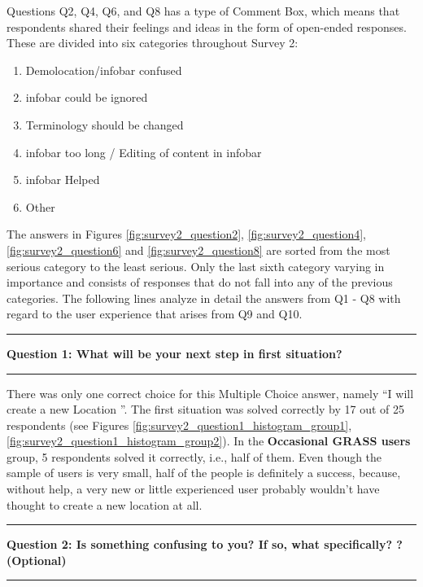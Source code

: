 \documentclass[a4paper,10pt,twoside]{article}
\begin{document}
\newpage
\noindent Questions Q2, Q4, Q6, and Q8 has a type of Comment Box,
which means that respondents shared their feelings and ideas in the
form of open-ended responses. These are divided into six categories
throughout Survey 2:

\begin{enumerate}
\item Demolocation/infobar confused
\item infobar could be ignored
\item Terminology should be changed
\item infobar too long / Editing of content in infobar
\item infobar Helped
\item Other
\end{enumerate}

\noindent The answers in Figures \ref{fig:survey2_question2},
\ref{fig:survey2_question4}, \ref{fig:survey2_question6} and
\ref{fig:survey2_question8} are sorted from the most serious category
to the least serious. Only the last sixth category varying in
importance and consists of responses that do not fall into any of the
previous categories. The following lines analyze in detail the answers
from Q1 - Q8 with regard to the user experience that arises from Q9
and Q10.

\par\noindent\rule{\textwidth}{0.4pt}
\noindent \textbf{Question 1: What will be your next step in first situation?}
\par\noindent\rule{\textwidth}{0.4pt}

\noindent There was only one correct choice for this Multiple Choice
answer, namely ``I will create a new Location ''. The first situation
was solved correctly by 17 out of 25 respondents (see Figures
\ref{fig:survey2_question1_histogram_group1},
\ref{fig:survey2_question1_histogram_group2}). In the
\textbf{Occasional GRASS users} group, 5 respondents solved it
correctly, i.e., half of them. Even though the sample of users is very
small, half of the people is definitely a success, because, without
help, a very new or little experienced user probably wouldn't have
thought to create a new location at all.

\par\noindent\rule{\textwidth}{0.4pt}
\noindent \textbf{Question 2: Is something confusing to you? If so, what specifically?
  ? (Optional)}
\par\noindent\rule{\textwidth}{0.4pt}
\end{document}
